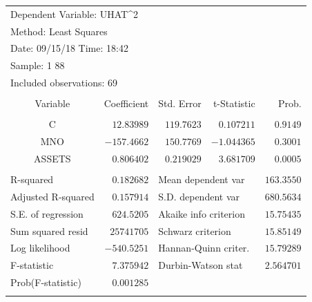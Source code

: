 \documentclass[12pt]{report}
\begin{document}
\begin{table}[!htbp]
	\centering
	\begin{tabular}{lrrrr}
		\multicolumn{3}{l}{Dependent Variable: UHAT\textasciicircum 2}&\multicolumn{1}{c}{}&\multicolumn{1}{c}{}\\
		\multicolumn{3}{l}{Method: Least Squares}&\multicolumn{1}{c}{}&\multicolumn{1}{c}{}\\
		\multicolumn{3}{l}{Date: 09/15/18   Time: 18:42}&\multicolumn{1}{c}{}&\multicolumn{1}{c}{}\\
		\multicolumn{2}{l}{Sample: 1 88}&\multicolumn{1}{c}{}&\multicolumn{1}{c}{}&\multicolumn{1}{c}{}\\
		\multicolumn{3}{l}{Included observations: 69}&\multicolumn{1}{c}{}&\multicolumn{1}{c}{}\\
		[4.5pt] \hline \\ [-4.5pt]
		\multicolumn{1}{c}{Variable}&\multicolumn{1}{r}{Coefficient}&\multicolumn{1}{r}{Std. Error}&\multicolumn{1}{r}{t-Statistic}&\multicolumn{1}{r}{Prob.}\\
		[4.5pt] \hline \\ [-4.5pt]
		\multicolumn{1}{c}{C}&\multicolumn{1}{r}{$12.83989$}&\multicolumn{1}{r}{$119.7623$}&\multicolumn{1}{r}{$0.107211$}&\multicolumn{1}{r}{$0.9149$}\\
		\multicolumn{1}{c}{MNO}&\multicolumn{1}{r}{$-157.4662$}&\multicolumn{1}{r}{$150.7769$}&\multicolumn{1}{r}{$-1.044365$}&\multicolumn{1}{r}{$0.3001$}\\
		\multicolumn{1}{c}{ASSETS}&\multicolumn{1}{r}{$0.806402$}&\multicolumn{1}{r}{$0.219029$}&\multicolumn{1}{r}{$3.681709$}&\multicolumn{1}{r}{$0.0005$}\\
		[4.5pt] \hline \\ [-4.5pt]
		\multicolumn{1}{l}{R-squared}&\multicolumn{1}{r}{$0.182682$}&\multicolumn{2}{l}{Mean dependent var}&\multicolumn{1}{r}{$163.3550$}\\
		\multicolumn{1}{l}{Adjusted R-squared}&\multicolumn{1}{r}{$0.157914$}&\multicolumn{2}{l}{S.D. dependent var}&\multicolumn{1}{r}{$680.5634$}\\
		\multicolumn{1}{l}{S.E. of regression}&\multicolumn{1}{r}{$624.5205$}&\multicolumn{2}{l}{Akaike info criterion}&\multicolumn{1}{r}{$15.75435$}\\
		\multicolumn{1}{l}{Sum squared resid}&\multicolumn{1}{r}{$25741705$}&\multicolumn{2}{l}{Schwarz criterion}&\multicolumn{1}{r}{$15.85149$}\\
		\multicolumn{1}{l}{Log likelihood}&\multicolumn{1}{r}{$-540.5251$}&\multicolumn{2}{l}{Hannan-Quinn criter.}&\multicolumn{1}{r}{$15.79289$}\\
		\multicolumn{1}{l}{F-statistic}&\multicolumn{1}{r}{$7.375942$}&\multicolumn{2}{l}{Durbin-Watson stat}&\multicolumn{1}{r}{$2.564701$}\\
		\multicolumn{1}{l}{Prob(F-statistic)}&\multicolumn{1}{r}{$0.001285$}&\multicolumn{1}{c}{}&\multicolumn{1}{c}{}&\multicolumn{1}{c}{}\\
		[4.5pt] \hline \\ [-4.5pt]
	\end{tabular}
\end{table} \vspace{-\baselineskip}\noindent
\end{document}
